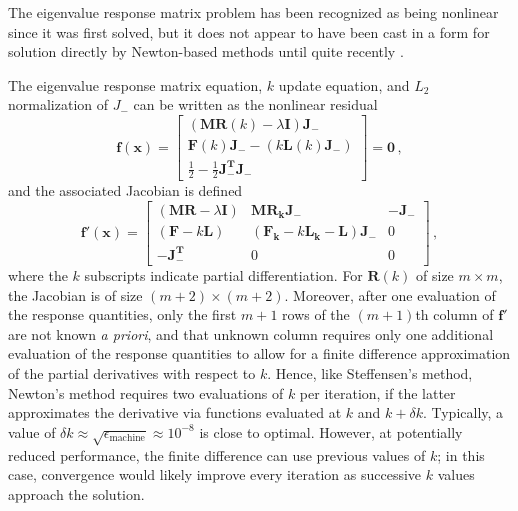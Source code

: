 The eigenvalue response matrix problem has been recognized as being
nonlinear since it was first solved, but it does not 
appear to have been cast in a form for solution directly by 
Newton-based methods until quite 
recently \cite{ roberts2011ser, roberts2010ncm}.  

The eigenvalue response matrix equation, $k$ update equation, 
and $L_2$ normalization of $J_{-}$ can be written as the nonlinear 
residual
    \begin{equation}
    \mathbf{f(x)} = \left [\begin{array}{c}
            (\mathbf{M}\mathbf{R}(k)-\lambda \mathbf{I}) \mathbf{J_-} \\
            \mathbf{F}(k)\mathbf{J_-} - (k\mathbf{L}(k)\mathbf{J_-} ) \\
            \frac{1}{2}-\frac{1}{2} \mathbf{J^T_-} \mathbf{J_-}   
          \end{array} 
    \right ]  = \mathbf{0} \, ,
    \label{eq:residual}
    \end{equation}
and the associated  Jacobian is defined
  \begin{equation}
  \mathbf{f'(x)} = \left [\begin{array}{ccc}
          (\mathbf{M}\mathbf{R}-\lambda \mathbf{I})  
          &  \mathbf{M}\mathbf{R_k}\mathbf{J_-}                     
          & \mathbf{-J_-}  \\
          (\mathbf{F}-k\mathbf{L})                   
          &  (\mathbf{F_k}-k\mathbf{L_k}-\mathbf{L}) \mathbf{J_-}   
          & 0  \\
          \mathbf{-J^T_-}                             
          & 0                                                       
          & 0
        \end{array} 
  \right ]  \, ,
  \label{eq:jacobian}
  \end{equation}
where the $k$ subscripts indicate partial differentiation.
For $\mathbf{R}(k)$ of size $m\times m$, the Jacobian is of 
size $(m+2)\times(m+2)$.  Moreover, after one evaluation of 
the response quantities, only the first $m+1$ rows of the $(m+1)$th 
column of $\mathbf{f'}$ are not known {\it a priori}, and that 
unknown column requires only one additional evaluation of the 
response quantities to allow for a finite difference 
approximation of the partial derivatives with respect to $k$.
Hence, like Steffensen's method, Newton's method requires two 
evaluations of $k$ per iteration, if the latter approximates the 
derivative via functions evaluated at $k$ and $k + \delta k$.  
Typically, a value of 
$\delta k \approx \sqrt{\epsilon_{\text{machine}}} \approx 10^{-8}$
is close to optimal.  However, at potentially reduced performance, the 
finite difference can use previous values of $k$;  in this 
case, convergence would likely improve every iteration as successive $k$ 
values approach the solution.  

